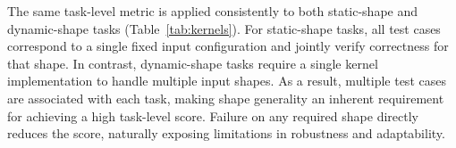 The same task-level metric is applied consistently to both static-shape and dynamic-shape tasks (Table~\ref{tab:kernels}). For static-shape tasks, all test cases correspond to a single fixed input configuration and jointly verify correctness for that shape. In contrast, dynamic-shape tasks require a single kernel implementation to handle multiple input shapes. As a result, multiple test cases are associated with each task, making shape generality an inherent requirement for achieving a high task-level score. Failure on any required shape directly reduces the score, naturally exposing limitations in robustness and adaptability.

